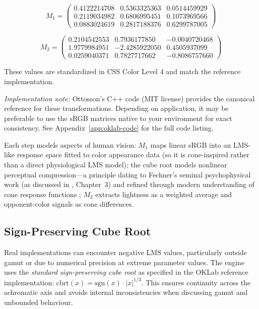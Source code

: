 \begin{equation}
    M_1 = \begin{pmatrix}
    0.4122214708 & 0.5363325363 & 0.0514459929 \\
    0.2119034982 & 0.6806995451 & 0.1073969566 \\
    0.0883024619 & 0.2817188376 & 0.6299787005
    \end{pmatrix}
    \label{eq:oklab-m1}
\end{equation}

\begin{equation}
    M_2 = \begin{pmatrix}
    0.2104542553 & 0.7936177850 & -0.0040720468 \\
    1.9779984951 & -2.4285922050 & 0.4505937099 \\
    0.0259040371 & 0.7827717662 & -0.8086757660
    \end{pmatrix}
    \label{eq:oklab-m2}
\end{equation}

These values are standardized in CSS Color Level 4 \citep{csscolor4} and match the reference implementation.

\emph{Implementation note:} Ottosson's C++ code (MIT license) provides the canonical reference for these transformations. Depending on application, it may be preferable to use the sRGB matrices native to your environment for exact consistency. See Appendix~\ref{app:oklab-code} for the full code listing.

Each step models aspects of human vision: $M_1$ maps linear sRGB into an LMS-like response space fitted to color appearance data (so it is cone-inspired rather than a direct physiological LMS model); the cube root models nonlinear perceptual compression—a principle dating to Fechner's seminal psychophysical work (as discussed in \citealt{fairchild2013}, Chapter~3) and refined through modern understanding of cone response functions \citep{ottosson2020}; $M_2$ extracts lightness as a weighted average and opponent-color signals as cone differences.

\subsection{Sign-Preserving Cube Root}

Real implementations can encounter negative LMS values, particularly outside gamut or due to numerical precision at extreme parameter values. The engine uses the \emph{standard sign-preserving cube root} as specified in the OKLab reference implementation: $\text{cbrt}(x) = \text{sgn}(x) \cdot |x|^{1/3}$. This ensures continuity across the achromatic axis and avoids internal inconsistencies when discussing gamut and unbounded behaviour.

